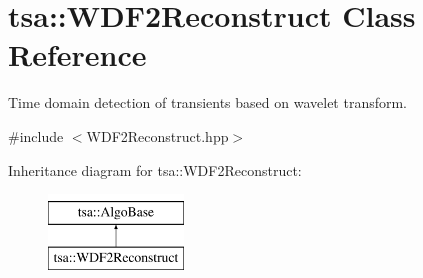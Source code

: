 \hypertarget{classtsa_1_1_w_d_f2_reconstruct}{}\section{tsa\+:\+:W\+D\+F2\+Reconstruct Class Reference}
\label{classtsa_1_1_w_d_f2_reconstruct}


Time domain detection of transients based on wavelet transform.  




{\ttfamily \#include $<$W\+D\+F2\+Reconstruct.\+hpp$>$}

Inheritance diagram for tsa\+:\+:W\+D\+F2\+Reconstruct\+:\begin{figure}[H]
\begin{center}
\leavevmode
\includegraphics[height=2.000000cm]{classtsa_1_1_w_d_f2_reconstruct}
\end{center}
\end{figure}
